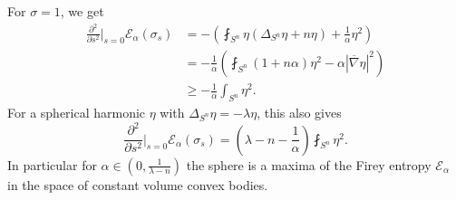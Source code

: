 \documentclass[12pt,a4paper]{article}
\begin{document}
For $ \sigma = 1 $, we get 
\begin{align*}
   \frac{\partial^{2}}{\partial s^{2}}\bigg|_{s=0} \mathcal{E}_{\alpha}(\sigma_{s}) & = - \left( \fint_{S^{n}} \eta(\Delta_{S^{n}} \eta + n \eta) + \frac{1}{\alpha}\eta^{2} \right) \\
   & = -\frac{1}{\alpha} \left( \fint_{S^{n}} (1+n \alpha)\eta^{2} - \alpha|\overline{\nabla}\eta|^{2}\right) \\
   & \ge -\frac{1}{\alpha} \int_{S^{n}}\eta^{2}.
\end{align*}
For a spherical harmonic $ \eta $ with $ \Delta_{S^{n}} \eta = -\lambda \eta $, this also gives 
\[ \frac{\partial^{2}}{\partial s^{2}}\bigg|_{s=0} \mathcal{E}_{\alpha}(\sigma_{s})  = \left( \lambda - n - \frac{1}{\alpha} \right)\fint_{S^{n}} \eta^{2}. \]
In particular for $ \alpha \in (0,\frac{1}{\lambda-n})  $ the sphere is a maxima of the Firey entropy  $ \mathcal{E}_{\alpha} $ in the space of constant volume convex bodies.
\end{document}

